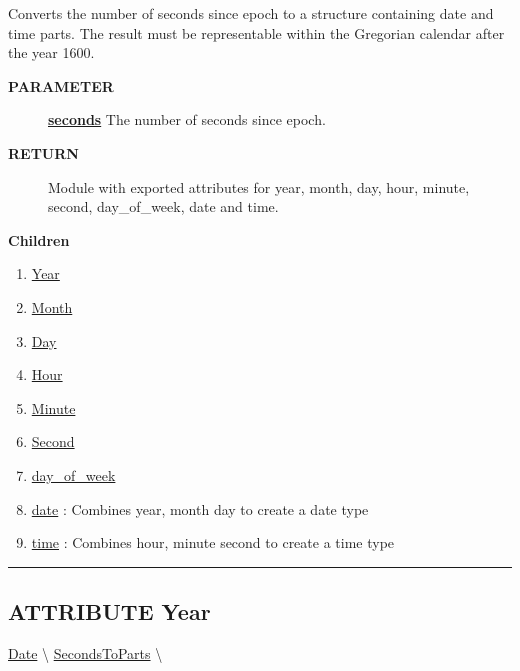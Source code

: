 \par
Converts the number of seconds since epoch to a structure containing date and time parts. The result must be representable within the Gregorian calendar after the year 1600.

\par
\begin{description}
\item [\colorbox{tagtype}{\color{white} \textbf{\textsf{PARAMETER}}}] \textbf{\underline{seconds}} The number of seconds since epoch.
\item [\colorbox{tagtype}{\color{white} \textbf{\textsf{RETURN}}}] \textbf{\underline{}} Module with exported attributes for year, month, day, hour, minute, second, day\_of\_week, date and time.
\end{description}

\textbf{Children}
\begin{enumerate}
\item \hyperlink{ecldoc:date.secondstoparts.result.year}{Year}
\item \hyperlink{ecldoc:date.secondstoparts.result.month}{Month}
\item \hyperlink{ecldoc:date.secondstoparts.result.day}{Day}
\item \hyperlink{ecldoc:date.secondstoparts.result.hour}{Hour}
\item \hyperlink{ecldoc:date.secondstoparts.result.minute}{Minute}
\item \hyperlink{ecldoc:date.secondstoparts.result.second}{Second}
\item \hyperlink{ecldoc:date.secondstoparts.result.day_of_week}{day\_of\_week}
\item \hyperlink{ecldoc:date.secondstoparts.result.date}{date}
: Combines year, month day to create a date type
\item \hyperlink{ecldoc:date.secondstoparts.result.time}{time}
: Combines hour, minute second to create a time type
\end{enumerate}

\rule{\linewidth}{0.5pt}

\subsection*{\textsf{\colorbox{headtoc}{\color{white} ATTRIBUTE}
Year}}

\hypertarget{ecldoc:date.secondstoparts.result.year}{}
\hspace{0pt} \hyperlink{ecldoc:Date}{Date} \textbackslash 
\hspace{0pt} \hyperlink{ecldoc:date.secondstoparts}{SecondsToParts} \textbackslash 


